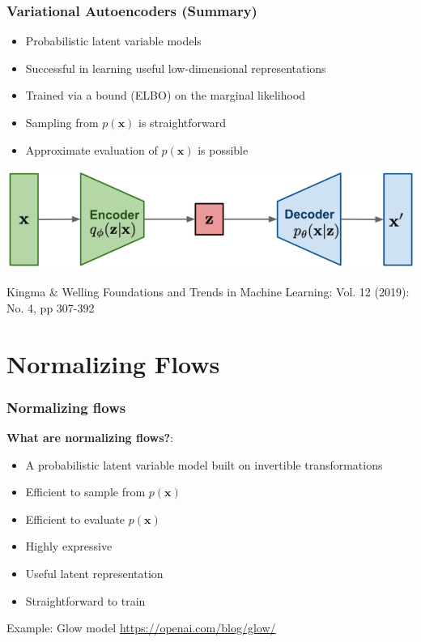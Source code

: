 \documentclass[10pt,aspectratio=169]{beamer}
\begin{document}
\begin{frame}
  \frametitle{Variational Autoencoders (Summary)}
\small{
\begin{itemize}
\item Probabilistic latent variable models
\item Successful in learning useful low-dimensional representations
\item Trained via a bound (ELBO) on the marginal likelihood
\item Sampling from $p(\mathbf{x})$ is straightforward
\item Approximate evaluation of $p(\mathbf{x})$ is possible
\end{itemize}
}
\begin{center}
\includegraphics[width=.7\textwidth]{images/vae}
\end{center}
\scriptsize{
Kingma \& Welling Foundations and Trends in Machine Learning: Vol. 12 (2019): No. 4, pp 307-392
}
\end{frame}


\section{Normalizing Flows}

\begin{frame}
  \frametitle{Normalizing flows}
\small{
\textbf{What are normalizing flows?}:
\begin{itemize}
\item A probabilistic latent variable model built on invertible transformations
\item Efficient to sample from $p(\mathbf{x})$
\item Efficient to evaluate $p(\mathbf{x})$
\item Highly expressive
\item Useful latent representation
\item Straightforward to train
\end{itemize}
\vspace{1cm}
Example: Glow model \url{https://openai.com/blog/glow/}
}
\end{frame}
\end{document}

